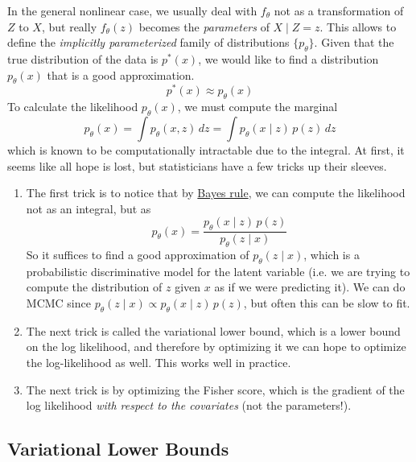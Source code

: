 \documentclass{article}
\begin{document}
  In the general nonlinear case, we usually deal with $f_\theta$ not as a transformation of $Z$ to $X$, but really $f_\theta (z)$ becomes the \textit{parameters} of $X \mid Z = z$. This allows to define the \textit{implicitly parameterized} family of distributions $\{p_\theta\}$. Given that the true distribution of the data is $p^\ast (x)$, we would like to find a distribution $p_\theta (x)$ that is a good approximation. 
  \begin{equation}
    p^\ast (x) \approx p_\theta (x)
  \end{equation}
  To calculate the likelihood $p_\theta (x)$, we must compute the marginal 
  \begin{equation}
    p_\theta (x) = \int p_\theta (x, z) \,dz = \int p_\theta (x \mid z) \, p(z) \,dz
  \end{equation}
  which is known to be computationally intractable due to the integral. At first, it seems like all hope is lost, but statisticians have a few tricks up their sleeves. 
  \begin{enumerate} 
    \item The first trick is to notice that by \hyperref[prob-thm:bayes-rule]{Bayes rule}, we can compute the likelihood not as an integral, but as 
    \begin{equation}
      p_\theta (x) = \frac{p_\theta (x \mid z) \, p(z)}{p_\theta (z \mid x)} 
    \end{equation}
    So it suffices to find a good approximation of $p_\theta (z \mid x)$, which is a probabilistic discriminative model for the latent variable (i.e. we are trying to compute the distribution of $z$ given $x$ as if we were predicting it). We can do MCMC since $p_\theta (z \mid x) \propto p_\theta (x \mid z) \, p(z)$, but often this can be slow to fit. 

    \item The next trick is called the variational lower bound, which is a lower bound on the log likelihood, and therefore by optimizing it we can hope to optimize the log-likelihood as well. This works well in practice. 

    \item The next trick is by optimizing the Fisher score, which is the gradient of the log likelihood \textit{with respect to the covariates} (not the parameters!). 
  \end{enumerate}

\subsection{Variational Lower Bounds} 
\end{document}
